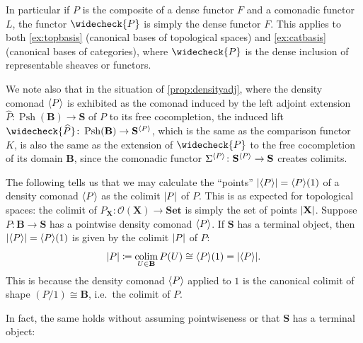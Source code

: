 \documentclass[11pt, oneside, article]{memoir}
\theoremstyle{plain}
\theoremstyle{definition}
\theoremstyle{remark}
\newenvironment{remark}
{\renewcommand\qedsymbol{$\lrcorner$}%
  \pushQED{\qed}\myremark}
{\popQED\endmyremark}
\DeclareMathOperator{\Psh}{Psh}
\DeclareMathOperator*{\colim}{colim}
\DeclarePairedDelimiter{\gen}{\langle}{\rangle}
\DeclarePairedDelimiter{\abs}{\lvert}{\rvert}
\newcommand{\namedcat}[1]{\mathbf{#1}}
\newcommand{\cat}[1]{\mathbf{#1}}
\newcommand{\spa}[1]{\mathbf{#1}}
\newcommand{\Set}{\namedcat{Set}}
\newcommand{\CoalgOn}[2]{{#2}^{#1}}
\newcommand{\CoalgS}[1]{\CoalgOn{#1}{\bS}}
\newcommand{\pts}[1]{{\abs{#1}}}
\newcommand{\lift}[1]{\widecheck{#1}}
\newcommand{\extend}[1]{\widehat{#1}}
\newcommand{\carr}{\Sigma}
\newcommand{\car}[1]{\carr^{#1}}
\newcommand{\carP}{\car{\cP}}
\newcommand{\ph}[1]{#1}
\newcommand{\topbasis}[1]{\pP_{#1}}
\newcommand{\Ps}[1]{\Psh(#1)}
\newcommand{\xU}{U}
\newcommand{\bB}{\cat{B}}
\newcommand{\bS}{\cat{S}}
\newcommand{\pP}{\ph{P}}
\newcommand{\cP}{\gen{\pP}}
\newcommand{\lP}{\lift{\pP}}
\newcommand{\tX}{\spa{X}}
\newcommand{\PS}{\CoalgS{\cP}}
\newcommand{\opens}[1]{\mathcal{O}(#1)}
\begin{document}
\begin{remark}
  In particular if $\pP$ is the composite of a dense functor $F$ and a
  comonadic functor $L$, the functor $\lP$ is simply the dense functor
  $F$. This applies to both \cref{ex:topbasis} (canonical bases of
  topological spaces) and \cref{ex:catbasis} (canonical bases of
  categories), where $\lP$ is the dense inclusion of representable
  sheaves or functors.
  
  We note also that in the situation of \cref{prop:densityadj}, where
  the density comonad $\cP$ is exhibited as the comonad induced by the
  left adjoint extension $\extend{\pP} \colon \Ps{\bB} \to \bS$ of
  $\pP$ to its free cocompletion, the induced lift
  $\lift{\extend{\pP}} \colon \Ps{\bB} \to \PS$, which is the same as
  the comparison functor $K$, is also the same as the extension of
  $\lP$ to the free cocompletion of its domain $\bB$, since the
  comonadic functor $\carP \colon \PS \to \bS$ creates colimits.
\end{remark}

The following tells us that we may calculate the ``points''
$\pts{\cP} = \cP(1)$ of a density comonad $\cP$ as the colimit
$\pts{\pP}$ of $\pP$. This is as expected for topological spaces: the
colimit of $\topbasis{\tX} \colon \opens{\tX} \to \Set$ is simply the
set of points $\pts{\tX}$.  
\begin{remark}\label{rem:pts}
  Suppose $\pP \colon \bB \to \bS$ has a pointwise density comonad
  $\cP$. If $\bS$ has a terminal object, then $\pts{\cP} = \cP(1)$ is
  given by the colimit $\pts{\pP}$ of $\pP$:
  \[
    \pts{\pP} \coloneqq \colim_{\xU\in\bB}\pP(\xU)\cong\cP(1) = \pts{\cP}.
  \]
  This is because the density comonad $\cP$ applied to $1$ is the
  canonical colimit of shape $(\pP/1) \cong \bB$, i.e.\ the colimit of
  $\pP$.
\end{remark}

In fact, the same holds without assuming pointwiseness or that $\bS$ has a terminal object:
\end{document}
